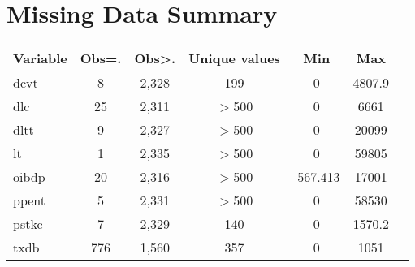 \documentclass{article}
\begin{document}
\section*{Missing Data Summary}

\begin{tabular}{lcccccc}
    \toprule
    Variable & Obs=. & Obs>. & Unique values & Min & Max \\
    \midrule
    dcvt     & 8     & 2,328  & 199           & 0   & 4807.9  \\
    dlc      & 25    & 2,311  & $>$500        & 0   & 6661    \\
    dltt     & 9     & 2,327  & $>$500        & 0   & 20099   \\
    lt       & 1     & 2,335  & $>$500        & 0   & 59805   \\
    oibdp    & 20    & 2,316  & $>$500        & -567.413 & 17001 \\
    ppent    & 5     & 2,331  & $>$500        & 0   & 58530   \\
    pstkc    & 7     & 2,329  & 140           & 0   & 1570.2  \\
    txdb     & 776   & 1,560  & 357           & 0   & 1051    \\
    \bottomrule
\end{tabular}
\end{document}
